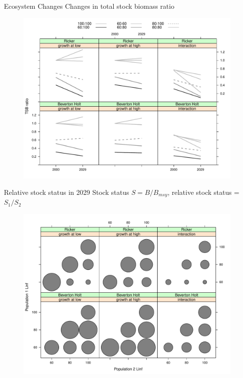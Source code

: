 \documentclass{beamer}
\begin{document}
\begin{withoutheadline}
\begin{frame}{Ecosystem Changes}
  Changes in total stock biomass ratio
  \begin{figure}
  \includegraphics[width=.8\textwidth]{Bratio-plot}
  \end{figure}
\end{frame}
\end{withoutheadline}


\begin{withoutheadline}
\begin{frame}{Relative stock status in 2029}
    Stock status $S = B/B_{msy}$, relative stock status = $S_1/S_2$
  \begin{figure}
  \includegraphics[width=.8\textwidth]{Bmsy-plot}
  \end{figure}
\end{frame}
\end{withoutheadline}
\end{document}
